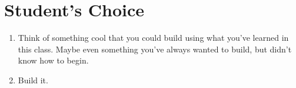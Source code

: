 \section{Student's Choice}


\bigskip

\begin{enumerate}[wide]

\item Think of something cool that you could build using what you've learned in this class.  Maybe even something you've always wanted to build, but didn't know how to begin.

\item Build it.


\end{enumerate}






